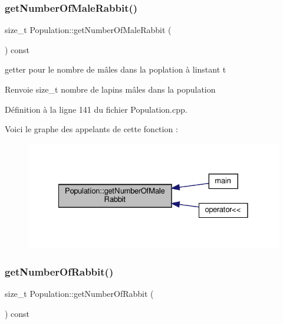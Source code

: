 \subsubsection{\texorpdfstring{get\+Number\+Of\+Male\+Rabbit()}{getNumberOfMaleRabbit()}}
{\footnotesize\ttfamily size\+\_\+t Population\+::get\+Number\+Of\+Male\+Rabbit (\begin{DoxyParamCaption}{ }\end{DoxyParamCaption}) const}



getter pour le nombre de mâles dans la poplation à l\textquotesingle{}instant t 

\begin{DoxyReturn}{Renvoie}
size\+\_\+t nombre de lapins mâles dans la population 
\end{DoxyReturn}


Définition à la ligne 141 du fichier Population.\+cpp.

Voici le graphe des appelants de cette fonction \+:
\nopagebreak
\begin{figure}[H]
\begin{center}
\leavevmode
\includegraphics[width=328pt]{classPopulation_a74dc9a5e829548a16d7910d7c17bb751_icgraph}
\end{center}
\end{figure}
\mbox{\label{classPopulation_a7388e8d8308abe505b7fa95c759a03ea}} 
\subsubsection{\texorpdfstring{get\+Number\+Of\+Rabbit()}{getNumberOfRabbit()}}
{\footnotesize\ttfamily size\+\_\+t Population\+::get\+Number\+Of\+Rabbit (\begin{DoxyParamCaption}{ }\end{DoxyParamCaption}) const}



